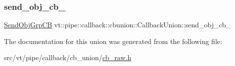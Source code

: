\subsubsection{\texorpdfstring{send\+\_\+obj\+\_\+cb\+\_\+}{send\_obj\_cb\_}}
{\footnotesize\ttfamily \hyperlink{structvt_1_1pipe_1_1callback_1_1cbunion_1_1_send_obj_grp_c_b}{Send\+Obj\+Grp\+CB} vt\+::pipe\+::callback\+::cbunion\+::\+Callback\+Union\+::send\+\_\+obj\+\_\+cb\+\_\+}



The documentation for this union was generated from the following file\+:\begin{DoxyCompactItemize}
\item 
src/vt/pipe/callback/cb\+\_\+union/\hyperlink{cb__raw_8h}{cb\+\_\+raw.\+h}\end{DoxyCompactItemize}
